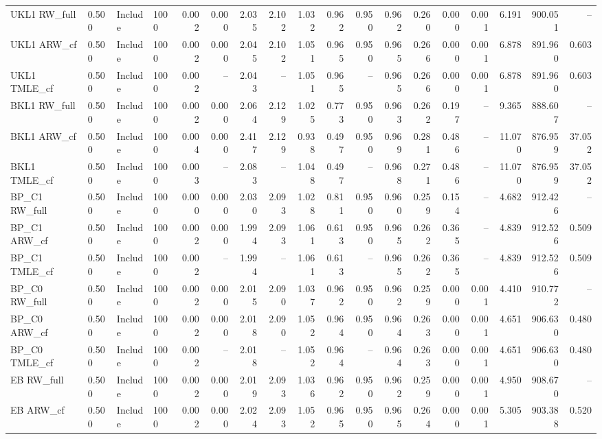 \begin{tabular}{llllrrrrrrrrrrrrrr}
UKL1 RW\_full & 0.500 & Include & 1000 & 0.002 & 0.000 & 2.035 & 2.102 & 1.032 & 0.962 & 0.950 & 0.962 & 0.260 & 0.000 & 0.001 & 6.191 & 900.051 & -- \\
UKL1 ARW\_cf & 0.500 & Include & 1000 & 0.002 & 0.000 & 2.045 & 2.102 & 1.051 & 0.965 & 0.950 & 0.965 & 0.266 & 0.000 & 0.001 & 6.878 & 891.960 & 0.603 \\
UKL1 TMLE\_cf & 0.500 & Include & 1000 & 0.002 & -- & 2.043 & -- & 1.051 & 0.965 & -- & 0.965 & 0.266 & 0.000 & 0.001 & 6.878 & 891.960 & 0.603 \\
BKL1 RW\_full & 0.500 & Include & 1000 & 0.002 & 0.000 & 2.064 & 2.129 & 1.025 & 0.773 & 0.950 & 0.963 & 0.262 & 0.197 & -- & 9.365 & 888.607 & -- \\
BKL1 ARW\_cf & 0.500 & Include & 1000 & 0.004 & 0.000 & 2.417 & 2.129 & 0.938 & 0.497 & 0.950 & 0.969 & 0.281 & 0.486 & -- & 11.070 & 876.959 & 37.052 \\
BKL1 TMLE\_cf & 0.500 & Include & 1000 & 0.003 & -- & 2.083 & -- & 1.048 & 0.497 & -- & 0.968 & 0.271 & 0.486 & -- & 11.070 & 876.959 & 37.052 \\
BP\_C1 RW\_full & 0.500 & Include & 1000 & 0.000 & 0.000 & 2.030 & 2.093 & 1.028 & 0.811 & 0.950 & 0.960 & 0.259 & 0.154 & -- & 4.682 & 912.426 & -- \\
BP\_C1 ARW\_cf & 0.500 & Include & 1000 & 0.002 & 0.000 & 1.994 & 2.093 & 1.061 & 0.613 & 0.950 & 0.965 & 0.262 & 0.365 & -- & 4.839 & 912.526 & 0.509 \\
BP\_C1 TMLE\_cf & 0.500 & Include & 1000 & 0.002 & -- & 1.994 & -- & 1.061 & 0.613 & -- & 0.965 & 0.262 & 0.365 & -- & 4.839 & 912.526 & 0.509 \\
BP\_C0 RW\_full & 0.500 & Include & 1000 & 0.002 & 0.000 & 2.015 & 2.090 & 1.037 & 0.962 & 0.950 & 0.962 & 0.259 & 0.000 & 0.001 & 4.410 & 910.772 & -- \\
BP\_C0 ARW\_cf & 0.500 & Include & 1000 & 0.002 & 0.000 & 2.018 & 2.090 & 1.052 & 0.964 & 0.950 & 0.964 & 0.263 & 0.000 & 0.001 & 4.651 & 906.630 & 0.480 \\
BP\_C0 TMLE\_cf & 0.500 & Include & 1000 & 0.002 & -- & 2.018 & -- & 1.052 & 0.964 & -- & 0.964 & 0.263 & 0.000 & 0.001 & 4.651 & 906.630 & 0.480 \\
EB RW\_full & 0.500 & Include & 1000 & 0.002 & 0.000 & 2.019 & 2.093 & 1.036 & 0.962 & 0.950 & 0.962 & 0.259 & 0.000 & 0.001 & 4.950 & 908.670 & -- \\
EB ARW\_cf & 0.500 & Include & 1000 & 0.002 & 0.000 & 2.024 & 2.093 & 1.052 & 0.965 & 0.950 & 0.965 & 0.264 & 0.000 & 0.001 & 5.305 & 903.388 & 0.520 \\

\end{tabular}
